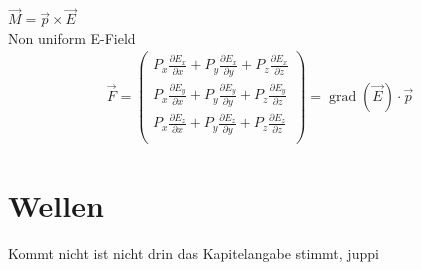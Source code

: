 \documentclass[a4paper]{scrartcl}
\begin{document}
$ \vec{M}=\vec{p}\times\vec{E}$\\

Non uniform E-Field\\

\begin{align}
\vec F = \begin{pmatrix}
P_x \frac{\partial E_x}{\partial x} + P_y \frac{\partial E_x}{\partial y} + P_z
\frac{\partial E_x}{\partial z}\\
P_x \frac{\partial E_y}{\partial x} + P_y \frac{\partial E_y}{\partial y} + P_z
\frac{\partial E_y}{\partial z}\\
P_x \frac{\partial E_z}{\partial x} + P_y \frac{\partial E_z}{\partial y} + P_z
\frac{\partial E_z}{\partial z}\\
\end{pmatrix}
= \operatorname{grad} (\vec E) \cdot \vec p
\end{align}

\section{Wellen}

Kommt nicht ist nicht drin das Kapitelangabe stimmt, juppi
\end{document}
